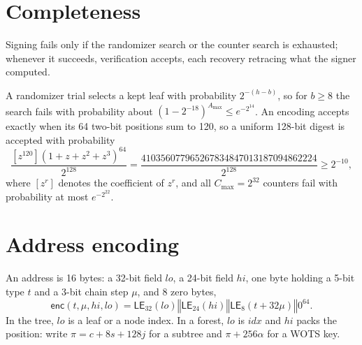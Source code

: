 \documentclass[11pt]{article}
\theoremstyle{plain}
\theoremstyle{definition}
\newcommand{\LE}{\mathsf{LE}}
\newcommand{\concat}{\mathbin\Vert}
\newcommand{\amax}{A_{\max}}
\newcommand{\cmax}{C_{\max}}
\newcommand{\idx}{\mathit{idx}}
\begin{document}
\section{Completeness}
\label{sec:completeness}

Signing fails only if the randomizer search or the counter search is exhausted; whenever it succeeds, verification accepts, each recovery retracing what the signer computed.

A randomizer trial selects a kept leaf with probability $2^{-(h-b)}$, so for $b\geq8$ the search fails with probability about $(1-2^{-18})^{\amax}\leq e^{-2^{14}}$. An encoding accepts exactly when its 64 two-bit positions sum to 120, so a uniform 128-bit digest is accepted with probability
\[
  \frac{[z^{120}](1+z+z^2+z^3)^{64}}{2^{128}}
  =\frac{410356077965267834847013187094862224}{2^{128}}
  \geq2^{-10},
\]
where $[z^r]$ denotes the coefficient of $z^r$, and all $\cmax=2^{32}$ counters fail with probability at most $e^{-2^{22}}$.

\appendix
\section{Address encoding}
\label{sec:tweaks}

An address is 16 bytes: a 32-bit field $\mathit{lo}$, a 24-bit field $\mathit{hi}$, one byte holding a 5-bit type $t$ and a 3-bit chain step $\mu$, and 8 zero bytes,
\[
  \mathsf{enc}(t,\mu,\mathit{hi},\mathit{lo})=\LE_{32}(\mathit{lo})\concat\LE_{24}(\mathit{hi})\concat\LE_8(t+32\mu)\concat0^{64}.
\]
In the tree, $\mathit{lo}$ is a leaf or a node index. In a forest, $\mathit{lo}$ is $\idx$ and $\mathit{hi}$ packs the position: write $\pi=c+8s+128j$ for a subtree and $\pi+256\alpha$ for a WOTS key.
\end{document}
